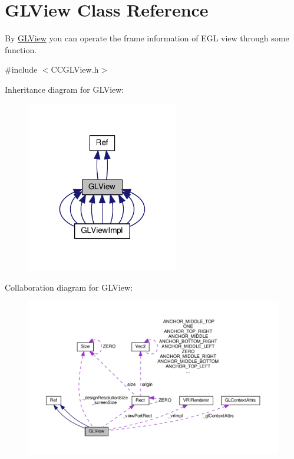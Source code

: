 \hypertarget{classGLView}{}\section{G\+L\+View Class Reference}
\label{classGLView}


By \hyperlink{classGLView}{G\+L\+View} you can operate the frame information of E\+GL view through some function.  




{\ttfamily \#include $<$C\+C\+G\+L\+View.\+h$>$}



Inheritance diagram for G\+L\+View\+:
\nopagebreak
\begin{figure}[H]
\begin{center}
\leavevmode
\includegraphics[width=188pt]{classGLView__inherit__graph}
\end{center}
\end{figure}


Collaboration diagram for G\+L\+View\+:
\nopagebreak
\begin{figure}[H]
\begin{center}
\leavevmode
\includegraphics[width=350pt]{classGLView__coll__graph}
\end{center}
\end{figure}

